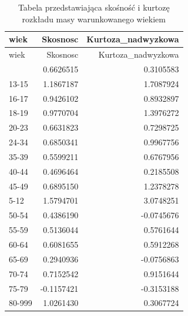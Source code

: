 \documentclass[
  letterpaper,
  DIV=11,
  numbers=noendperiod]{scrartcl}
\newenvironment{Shaded}{\begin{snugshade}}{\end{snugshade}}
\newcommand{\AttributeTok}[1]{\textcolor[rgb]{0.40,0.45,0.13}{#1}}
\newcommand{\FunctionTok}[1]{\textcolor[rgb]{0.28,0.35,0.67}{#1}}
\newcommand{\NormalTok}[1]{\textcolor[rgb]{0.00,0.23,0.31}{#1}}
\newcommand{\OtherTok}[1]{\textcolor[rgb]{0.00,0.23,0.31}{#1}}
\newcommand{\SpecialCharTok}[1]{\textcolor[rgb]{0.37,0.37,0.37}{#1}}
\begin{document}
\begin{Shaded}
\end{Shaded}

\begin{longtable}[]{@{}lrr@{}}
\caption{Tabela przedstawiająca skośność i kurtozę rozkładu masy
warunkowanego wiekiem }\tabularnewline
\toprule\noalign{}
wiek & Skosnosc & Kurtoza\_nadwyzkowa \\
\midrule\noalign{}
\endfirsthead
\toprule\noalign{}
wiek & Skosnosc & Kurtoza\_nadwyzkowa \\
\midrule\noalign{}
\endhead
\bottomrule\noalign{}
\endlastfoot
& 0.6626515 & 0.3105583 \\
13-15 & 1.1867187 & 1.7087924 \\
16-17 & 0.9426102 & 0.8932897 \\
18-19 & 0.9770704 & 1.3976272 \\
20-23 & 0.6631823 & 0.7298725 \\
24-34 & 0.6850341 & 0.9967756 \\
35-39 & 0.5599211 & 0.6767956 \\
40-44 & 0.4696464 & 0.2185508 \\
45-49 & 0.6895150 & 1.2378278 \\
5-12 & 1.5794701 & 3.0748251 \\
50-54 & 0.4386190 & -0.0745676 \\
55-59 & 0.5136044 & 0.5761644 \\
60-64 & 0.6081655 & 0.5912268 \\
65-69 & 0.2940936 & -0.0756863 \\
70-74 & 0.7152542 & 0.9151644 \\
75-79 & -0.1157421 & -0.3153188 \\
80-999 & 1.0261430 & 0.3067724 \\
\end{longtable}
\end{document}
